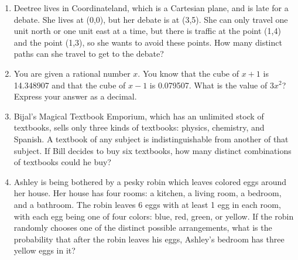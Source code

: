\documentclass[11pt]{article}
\theoremstyle{definition}
\begin{document}
\begin{enumerate}
\item Deetree lives in Coordinateland, which is a Cartesian plane, and is late for a debate. She lives at (0,0), but her debate is at (3,5). She can only travel one unit north or one unit east at a time, but there is traffic at the point (1,4) and the point (1,3), so she wants to avoid these points. How many distinct paths can she travel to get to the debate?

\item You are given a rational number $x$. You know that the cube of $x+1$ is 14.348907 and that the cube of $x-1$ is 0.079507. What is the value of $3x^2$? Express your answer as a decimal.

\item Bijal's Magical Textbook Emporium, which has an unlimited stock of textbooks, sells only three kinds of textbooks: physics, chemistry, and Spanish. A textbook of any subject is indistinguishable from another of that subject. If Bill decides to buy six textbooks, how many distinct combinations of textbooks could he buy?

\item Ashley is being bothered by a pesky robin which leaves colored eggs around her house. Her house has four rooms: a kitchen, a living room, a bedroom, and a bathroom. The robin leaves 6 eggs with at least 1 egg in each room, with each egg being one of four colors: blue, red, green, or yellow. If the robin randomly chooses one of the distinct possible arrangements, what is the probability that after the robin leaves his eggs, Ashley's bedroom has three yellow eggs in it?

\end{enumerate}


\eject
\end{document}
